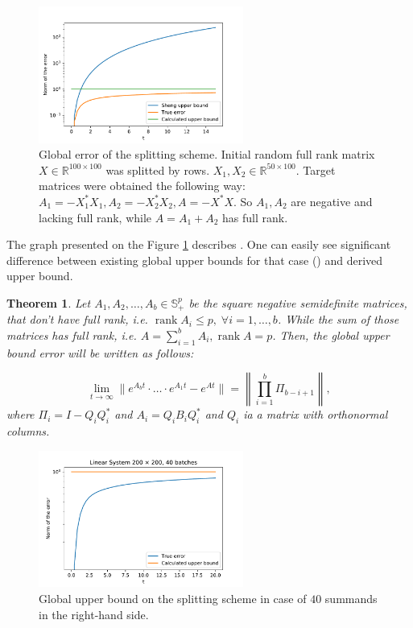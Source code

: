 \documentclass{article}
\newtheorem{theorem}{Theorem}
\begin{document}
\begin{figure}[h!]
	\centering
	\includegraphics[width=0.6\textwidth]{upper_bound_2.pdf}
	\caption{Global error of the splitting scheme. Initial random full rank matrix $X \in \mathbb{R}^{100 \times 100}$ was splitted by rows. $X_1, X_2 \in \mathbb{R}^{50 \times 100}$. Target matrices were obtained the following way: $A_1 = -X_1^*X_1, A_2 = -X_2^*X_2, A = -X^*X$. So $A_1, A_2$ are negative and lacking full rank, while $A = A_1 + A_2$ has full rank.}
	\label{strang:fig:upper_bound_2}
\end{figure}

The graph presented on the Figure \ref{strang:fig:upper_bound_2} describes . One can easily see significant difference between existing global upper bounds for that case (\cite{sheng1994global}) and derived upper bound.

\begin{theorem}\label{strang:theorem_uppbound}
	Let $A_1, A_2, \ldots, A_b \in \mathbb{S}^p_{+}$ be the square negative semidefinite matrices, that don't have full rank, i.e. $\operatorname{rank}{A_i} \leq p, \;\forall i = 1, \ldots, b$. While the sum of those matrices has full rank, i.e. $A = \sum\limits_{i=1}^b A_i, \operatorname{rank}{A} = p$. Then, the global upper bound error will be written as follows:

	\begin{equation}\label{strang:global_error_upper_bound}
		\lim_{t \to \infty}\| e^{A_bt} \cdot \ldots \cdot e^{A_1t} - e^{At}\| = \left\|\prod\limits_{i=1}^b \Pi_{b-i+1}\right\|,
	\end{equation}
	where $\Pi_i = I - Q_iQ_i^*$ and $A_i = Q_iB_iQ_i^*$ and $Q_i$ ia a matrix with orthonormal columns. 
\end{theorem}

\begin{figure}[h!]
	\centering
	\includegraphics[width=0.6\textwidth]{upper_bound_many.pdf}
	\caption{Global upper bound on the splitting scheme in case of $40$ summands in the right-hand side. }
	\label{strang:fig:upper_bound_many}
\end{figure}
\end{document}
